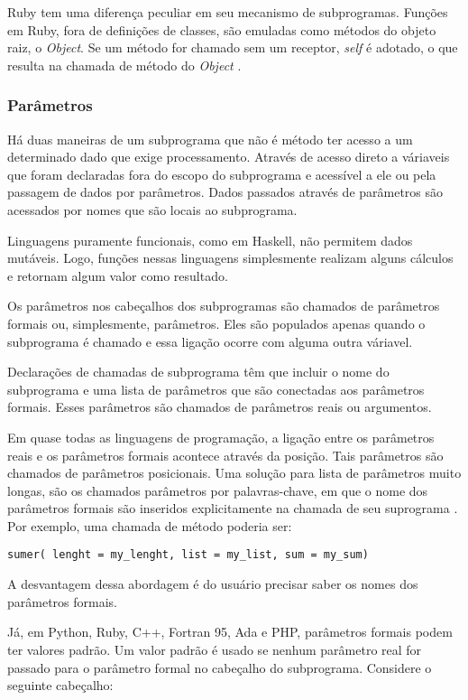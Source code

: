 Ruby tem uma diferença peculiar em seu mecanismo de subprogramas.
Funções em Ruby, fora de definições de classes,
são emuladas como métodos do objeto raiz, o \emph{Object}.
Se um método for chamado sem um receptor, \emph{self} é adotado,
o que resulta na chamada de método do \emph{Object} \cite{thomas2004programming}.

\subsubsection{Parâmetros} %
\label{ssub:parametros}
Há duas maneiras de um subprograma que não é método 
ter acesso a um determinado dado que exige processamento.
Através de acesso direto a váriaveis que foram declaradas fora do escopo do subprograma e acessível a ele
ou pela passagem de dados por parâmetros.
Dados passados através de parâmetros são acessados por nomes que são locais ao subprograma.

Linguagens puramente funcionais, como em Haskell, não permitem dados mutáveis. 
Logo, funções nessas linguagens simplesmente realizam alguns cálculos e retornam 
algum valor como resultado.

Os parâmetros nos cabeçalhos dos subprogramas são chamados de
parâmetros formais ou, simplesmente, parâmetros. Eles são populados apenas quando o subprograma é chamado
e essa ligação ocorre com alguma outra váriavel.

Declarações de chamadas de subprograma têm que incluir o nome do subprograma e
uma lista de parâmetros que são conectadas aos parâmetros formais.
Esses parâmetros são chamados de parâmetros reais ou argumentos.

Em quase todas as linguagens de programação, a ligação entre os parâmetros reais
e os parâmetros formais acontece através da posição. Tais parâmetros são chamados de parâmetros posicionais.
Uma solução para lista de parâmetros muito longas, são os chamados parâmetros por palavras-chave,
em que o nome dos parâmetros formais são inseridos explicitamente na chamada de seu suprograma \cite{sebesta}.
Por exemplo, uma chamada de método poderia ser:

\begin{verbatim}
sumer( lenght = my_lenght, list = my_list, sum = my_sum)
\end{verbatim}

A desvantagem dessa abordagem é do usuário precisar saber os nomes dos parâmetros formais.

Já, em Python, Ruby, C++, Fortran 95, Ada e PHP, parâmetros formais 
podem ter valores padrão. Um valor padrão é usado se nenhum parâmetro real for 
passado para o parâmetro formal no cabeçalho do subprograma.
Considere o seguinte cabeçalho:

